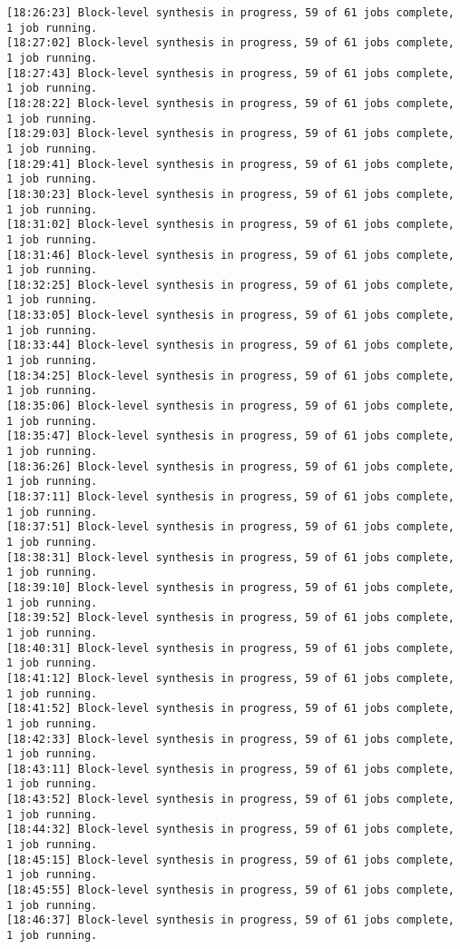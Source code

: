 \begin{lstlisting}[label=some-code-2,caption=Содержимое файла v++\_vinc.log]
[18:26:23] Block-level synthesis in progress, 59 of 61 jobs complete, 1 job running.
[18:27:02] Block-level synthesis in progress, 59 of 61 jobs complete, 1 job running.
[18:27:43] Block-level synthesis in progress, 59 of 61 jobs complete, 1 job running.
[18:28:22] Block-level synthesis in progress, 59 of 61 jobs complete, 1 job running.
[18:29:03] Block-level synthesis in progress, 59 of 61 jobs complete, 1 job running.
[18:29:41] Block-level synthesis in progress, 59 of 61 jobs complete, 1 job running.
[18:30:23] Block-level synthesis in progress, 59 of 61 jobs complete, 1 job running.
[18:31:02] Block-level synthesis in progress, 59 of 61 jobs complete, 1 job running.
[18:31:46] Block-level synthesis in progress, 59 of 61 jobs complete, 1 job running.
[18:32:25] Block-level synthesis in progress, 59 of 61 jobs complete, 1 job running.
[18:33:05] Block-level synthesis in progress, 59 of 61 jobs complete, 1 job running.
[18:33:44] Block-level synthesis in progress, 59 of 61 jobs complete, 1 job running.
[18:34:25] Block-level synthesis in progress, 59 of 61 jobs complete, 1 job running.
[18:35:06] Block-level synthesis in progress, 59 of 61 jobs complete, 1 job running.
[18:35:47] Block-level synthesis in progress, 59 of 61 jobs complete, 1 job running.
[18:36:26] Block-level synthesis in progress, 59 of 61 jobs complete, 1 job running.
[18:37:11] Block-level synthesis in progress, 59 of 61 jobs complete, 1 job running.
[18:37:51] Block-level synthesis in progress, 59 of 61 jobs complete, 1 job running.
[18:38:31] Block-level synthesis in progress, 59 of 61 jobs complete, 1 job running.
[18:39:10] Block-level synthesis in progress, 59 of 61 jobs complete, 1 job running.
[18:39:52] Block-level synthesis in progress, 59 of 61 jobs complete, 1 job running.
[18:40:31] Block-level synthesis in progress, 59 of 61 jobs complete, 1 job running.
[18:41:12] Block-level synthesis in progress, 59 of 61 jobs complete, 1 job running.
[18:41:52] Block-level synthesis in progress, 59 of 61 jobs complete, 1 job running.
[18:42:33] Block-level synthesis in progress, 59 of 61 jobs complete, 1 job running.
[18:43:11] Block-level synthesis in progress, 59 of 61 jobs complete, 1 job running.
[18:43:52] Block-level synthesis in progress, 59 of 61 jobs complete, 1 job running.
[18:44:32] Block-level synthesis in progress, 59 of 61 jobs complete, 1 job running.
[18:45:15] Block-level synthesis in progress, 59 of 61 jobs complete, 1 job running.
[18:45:55] Block-level synthesis in progress, 59 of 61 jobs complete, 1 job running.
[18:46:37] Block-level synthesis in progress, 59 of 61 jobs complete, 1 job running.

\end{lstlisting}
